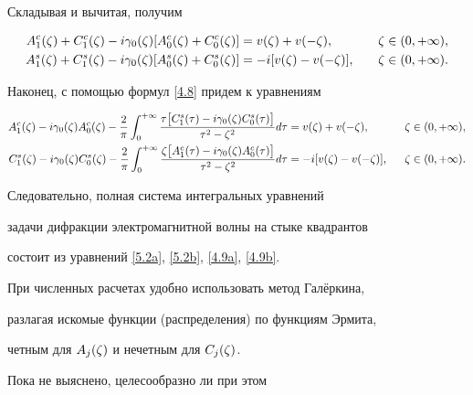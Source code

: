 Складывая и вычитая, получим


\begin{alignat*}{2}


\Acf(\dz)+\Ccf(\dz)-i \gazdz [\Acz(\dz)+\Ccz(\dz)]


&=v(\dz)+v(-\dz), &\quad \dz&\in(0,+\infty) ,\\


%


\Asf(\dz)+\Csf(\dz)-i \gazdz [\Asz(\dz)+\Csz(\dz)]


&=-i[v(\dz)-v(-\dz)], &\quad \dz&\in(0,+\infty) .


\end{alignat*}


Наконец, с помощью формул \eqref{4.8} придем к уравнениям


\begin{alignat}{2}


\label{5.2a}


\Acf(\dz)-i \gazdz \Acz(\dz)


-\frac{2}{\pi}\int_{0}^{+\infty}


\frac{\ta \bigl[ \Csf(\ta)-i\gazdz \Csz(\ta) \bigr]}


{\ta^2-\dz^2}d\ta  &=v(\dz)+v(-\dz), &\ \ \dz&\in(0,+\infty) , \\


%


\label{5.2b}


\Csf(\dz)-i \gazdz \Csz(\dz)


-\frac{2}{\pi}\int_{0}^{+\infty}


\frac{\dz \bigl[ \Acf(\ta)-i\gazdz \Acz(\ta) \bigr]}


{\ta^2-\dz^2}d\ta  &=-i[v(\dz)-v(-\dz)], &\ \ \dz&\in(0,+\infty).


\end{alignat}


Следовательно, полная система интегральных уравнений


задачи дифракции электромагнитной волны на стыке квадрантов


состоит из уравнений \eqref{5.2a}, \eqref{5.2b}, \eqref{4.9a}, \eqref{4.9b}.


При численных расчетах удобно использовать метод Гал\"еркина,


разлагая искомые функции (распределения) по функциям Эрмита,


четным для $A_j(\zeta)$ и нечетным для $C_j(\zeta)$.


Пока не выяснено, целесообразно ли при этом


